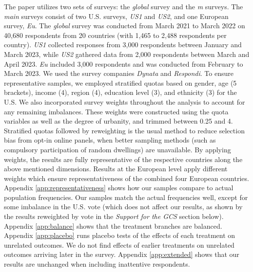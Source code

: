 \begin{bibunit}
\begin{small}
The paper utilizes two sets of surveys: the \textit{global} survey and the \textit{m} surveys. The \textit{main} surveys consist of two U.S. surveys, \textit{US1} and \textit{US2}, and one European survey, \textit{Eu}. The \textit{global} survey was conducted from March 2021 to March 2022 on 40,680 respondents from 20 countries (with 1,465 to 2,488 respondents per country). \textit{US1} collected responses from 3,000 respondents between January and March 2023, while \textit{US2} gathered data from 2,000 respondents between March and April 2023. \textit{Eu} included 3,000 respondents and was conducted from February to March 2023. We used the survey companies \emph{Dynata} and \emph{Respondi}. To ensure representative samples, we employed stratified quotas based on gender, age (5 brackets), income (4), region (4), education level (3), and ethnicity (3) for the U.S. We also incorporated survey weights throughout the analysis to account for any remaining imbalances. These weights were constructed using the quota variables as well as the degree of urbanity, and trimmed between 0.25 and 4. Stratified quotas followed by reweighting is the usual method to reduce selection bias from opt-in online panels, when better sampling methods (such as compulsory participation of random dwellings) are unavailable.\cite{scherpenzeel_how_2010} By applying weights, the results are fully representative of the respective countries along the above mentioned dimensions. %
Results at the European level apply different weights which ensure  representativeness of the combined four European countries. Appendix \ref{app:representativeness} shows how our samples compare to actual population frequencies. Our samples match the actual frequencies well, except for some imbalance in the U.S. vote (which does not affect our results, as shown by the results reweighted by vote in the \textit{Support for the GCS} section below). 
Appendix \ref{app:balance} shows that the treatment branches are balanced. Appendix \ref{app:placebo} runs placebo tests of the effects of each treatment on unrelated outcomes. We do not find effects of earlier treatments on unrelated outcomes arriving later in the survey. Appendix \ref{app:extended} shows that our results are unchanged when including inattentive respondents.



\end{small}
\end{bibunit}
